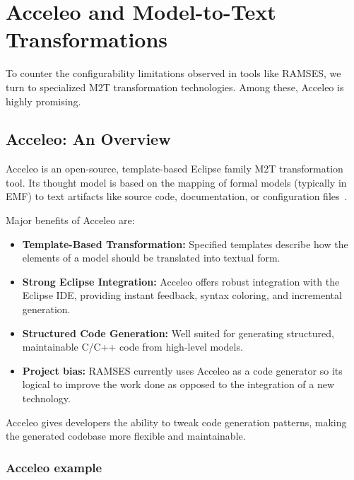 \section{Acceleo and Model-to-Text Transformations} \label{sec:folders_and_files}

To counter the configurability limitations observed in tools like \gls{RAMSES}, we turn to specialized \gls{M2T} transformation technologies. Among these, Acceleo is highly promising.

\subsection{Acceleo: An Overview} 
\label{sec:overview}

Acceleo is an open-source, template-based Eclipse family \gls{M2T} transformation tool. Its thought model is based on the mapping of formal models (typically in \gls{EMF}) to text artifacts like source code, documentation, or configuration files~\cite{AcceleoUserGuide}.

Major benefits of Acceleo are: 
\begin{itemize} 
	\item \textbf{Template-Based Transformation:} Specified templates describe how the elements of a model should be translated into textual form.
	\item \textbf{Strong Eclipse Integration:} Acceleo offers robust integration with the Eclipse IDE, providing instant feedback, syntax coloring, and incremental generation.
	\item \textbf{Structured Code Generation:} Well suited for generating structured, maintainable C/C++ code from high-level models.
	\item \textbf{Project bias:} \gls{RAMSES} currently uses Acceleo as a code generator so its logical to improve the work done as opposed to the integration of a new technology.
\end{itemize}

\begin{tcolorbox}[colback=blue!5, colframe=blue!40!black] Acceleo gives developers the ability to tweak code generation patterns, making the generated codebase more flexible and maintainable. \end{tcolorbox}

\subsubsection{Acceleo example}
\label{sec:example}

